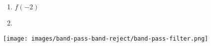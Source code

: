 \begin{minipage}[t]{0.48\linewidth}
    \begin{enumerate}
    \item $\displaystyle f(-2)$
    \item 
    \end{enumerate}
\end{minipage}
\begin{minipage}[t]{0.48\linewidth}
    \centering
    \strut\vspace*{-\baselineskip}\newline\texttt{[image: images/band-pass-band-reject/band-pass-filter.png]}
\end{minipage}